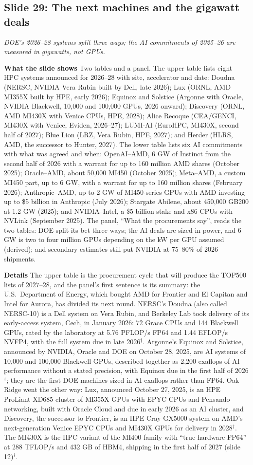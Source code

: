\documentclass[11pt,letterpaper]{article}
\newcommand{\slide}[3]{%
  \subsection[Slide #1: #2]{Slide #1: #2}%
  {\color{muted}\itshape #3\par}\medskip}
\newcommand{\para}[1]{\medskip\noindent\textbf{#1}\quad}
\begin{document}
\slide{29}{The next machines and the gigawatt deals}{DOE's 2026--28 systems split three ways; the AI commitments of 2025--26 are measured in gigawatts, not GPUs.}

\para{What the slide shows} Two tables and a panel. The upper table lists eight HPC systems announced for 2026--28 with site, accelerator and date: Doudna (NERSC, NVIDIA Vera Rubin built by Dell, late 2026); Lux (ORNL, AMD MI355X built by HPE, early 2026); Equinox and Solstice (Argonne with Oracle, NVIDIA Blackwell, 10,000 and 100,000 GPUs, 2026 onward); Discovery (ORNL, AMD MI430X with Venice CPUs, HPE, 2028); Alice Recoque (CEA/GENCI, MI430X with Venice, Eviden, 2026--27); LUMI-AI (EuroHPC, MI430X, second half of 2027); Blue Lion (LRZ, Vera Rubin, HPE, 2027); and Herder (HLRS, AMD, the successor to Hunter, 2027). The lower table lists six AI commitments with what was agreed and when: OpenAI--AMD, 6 GW of Instinct from the second half of 2026 with a warrant for up to 160 million AMD shares (October 2025); Oracle--AMD, about 50,000 MI450 (October 2025); Meta--AMD, a custom MI450 part, up to 6 GW, with a warrant for up to 160 million shares (February 2026); Anthropic--AMD, up to 2 GW of MI450-series GPUs with AMD investing up to \$5 billion in Anthropic (July 2026); Stargate Abilene, about 450,000 GB200 at 1.2 GW (2025); and NVIDIA--Intel, a \$5 billion stake and x86 CPUs with NVLink (September 2025). The panel, ``What the procurements say'', reads the two tables: DOE split its bet three ways; the AI deals are sized in power, and 6 GW is two to four million GPUs depending on the kW per GPU assumed (derived); and secondary estimates still put NVIDIA at 75--80\% of 2026 shipments.

\para{Details} The upper table is the procurement cycle that will produce the TOP500 lists of 2027--28, and the panel's first sentence is its summary: the U.S.\ Department of Energy, which bought AMD for Frontier and El Capitan and Intel for Aurora, has divided its next round. NERSC's Doudna (also called NERSC-10) is a Dell system on Vera Rubin, and Berkeley Lab took delivery of its early-access system, Cech, in January 2026: 72 Grace CPUs and 144 Blackwell GPUs, rated by the laboratory at 5.76 PFLOP/s FP64 and 1.44 EFLOP/s NVFP4, with the full system due in late 2026$^\dagger$. Argonne's Equinox and Solstice, announced by NVIDIA, Oracle and DOE on October 28, 2025, are AI systems of 10,000 and 100,000 Blackwell GPUs, described together as 2,200 exaflops of AI performance without a stated precision, with Equinox due in the first half of 2026$^\dagger$; they are the first DOE machines sized in AI exaflops rather than FP64. Oak Ridge went the other way: Lux, announced October 27, 2025, is an HPE ProLiant XD685 cluster of MI355X GPUs with EPYC CPUs and Pensando networking, built with Oracle Cloud and due in early 2026 as an AI cluster, and Discovery, the successor to Frontier, is an HPE Cray GX5000 system on AMD's next-generation Venice EPYC CPUs and MI430X GPUs for delivery in 2028$^\dagger$. The MI430X is the HPC variant of the MI400 family with ``true hardware FP64'' at 288 TFLOP/s and 432 GB of HBM4, shipping in the first half of 2027 (slide 12)$^\dagger$.
\end{document}
